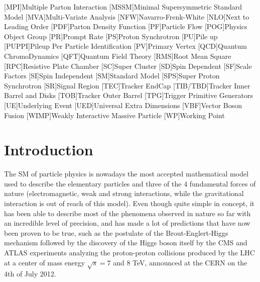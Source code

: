 \documentclass[a4paper, 10pt, openright]{report}
\begin{document}
\begin{multicols}{2}
\begin{acronym}
[MPI]{Multiple Parton Interaction}
[MSSM]{Minimal Supersymmetric Standard Model}
[MVA]{Multi-Variate Analysis}
[NFW]{Navarro-Frenk-White}
[NLO]{Next to Leading Order}
[PDF]{Parton Density Function}
[PF]{Particle Flow}
[POG]{Physics Object Group}
[PR]{Prompt Rate}
[PS]{Proton Synchrotron}
[PU]{Pile up}
[PUPPI]{Pileup Per Particle Identification}
[PV]{Primary Vertex}
[QCD]{Quantum ChromoDynamics}
[QFT]{Quantum Field Theory}
[RMS]{Root Mean Square}
[RPC]{Resistive Plate Chamber}
[SC]{Super Cluster}
[SD]{Spin Dependent}
[SF]{Scale Factors}
[SI]{Spin Independent}
[SM]{Standard Model}
[SPS]{Super Proton Synchrotron}
[SR]{Signal Region}
[TEC]{Tracker EndCap} 
[TIB/TBD]{Tracker Inner Barrel and Disks}
[TOB]{Tracker Outer Barrel}
[TPG]{Trigger Primitive Generators}
[UE]{Underlying Event}
[UED]{Universal Extra Dimensions}
[VBF]{Vector Boson Fusion}
[WIMP]{Weakly Interactive Massive Particle}
[WP]{Working Point}

\end{acronym}
\end{multicols}
\newpage

\tableofcontents

\thispagestyle{empty}
\newpage


\clearpage
\thispagestyle{empty}
\phantom{a}
\vfill
\newpage

\setlength{\parskip}{8pt}

\chapter{Introduction}

The \acf{SM} of particle physics \cite{SM} is nowadays the most accepted mathematical model used to describe the elementary particles and three of the 4 fundamental forces of nature (electromagnetic, weak and strong interactions, while the gravitational interaction is out of reach of this model). Even though quite simple in concept, it has been able to describe most of the phenomena observed in nature so far with an incredible level of precision, and has made a lot of predictions that have now been proven to be true, such as the postulate of the Brout-Englert-Higgs mechanism \cite{HiggsPostulate1, HiggsPostulate2} followed by the discovery of the Higgs boson itself \cite{HiggsDiscovery1, HiggsDiscovery2} by the \ac{CMS} \cite{CMS} and \ac{ATLAS} \cite{ATLAS} experiments analyzing the proton-proton collisions produced by the \acf{LHC} at a center of mass energy $\sqrt{s} = 7$ and 8 TeV, announced at the \ac{CERN} on the 4th of July 2012. 
\end{document}
